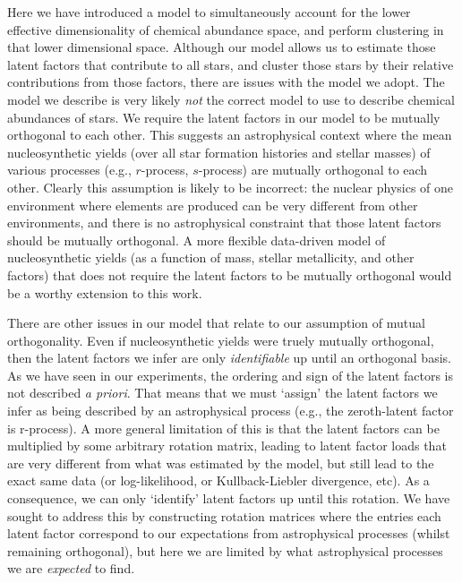 \documentclass[twocolumn]{aastex62}
\begin{document}
Here we have introduced a model to simultaneously account for the lower
effective dimensionality of chemical abundance space, and perform clustering
in that lower dimensional space. Although our model allows us to estimate
those latent factors that contribute to all stars, and cluster those stars by
their relative contributions from those factors, there are issues with the
model we adopt. The model we describe is very likely \emph{not} the correct
model to use to describe chemical abundances of stars. We require the latent
factors in our model to be mutually orthogonal to each other. This suggests
an astrophysical context where the mean nucleosynthetic yields (over all star
formation histories and stellar masses) of various
processes (e.g., $r$-process, $s$-process) are mutually orthogonal to each
other. Clearly this assumption is likely to be incorrect: the nuclear physics
of one environment where elements are produced  can be very different from
other environments, and there is no astrophysical constraint that those
latent factors should be mutually orthogonal.
A more flexible data-driven model of nucleosynthetic yields (as a function of mass,
stellar metallicity, and other factors) that does not require the latent
factors to be mutually orthogonal would be a worthy extension to this work.

There are other issues in our model that relate to our assumption of mutual
orthogonality. Even if nucleosynthetic yields were truely mutually orthogonal,
then the latent factors we infer are only \emph{identifiable} up until an
orthogonal basis. As we have seen in our experiments, the ordering and sign 
of the latent factors is not described \emph{a priori}. That means that we
must `assign' the latent factors we infer as being described by an astrophysical
process (e.g., the zeroth-latent factor is r-process). A more general limitation
of this is that the latent factors can be multiplied by some arbitrary rotation
matrix, leading to latent factor loads that are very different from what was
estimated by the model, but still lead to the exact same data (or log-likelihood,
or Kullback-Liebler divergence, etc). As a consequence, we can only `identify'
latent factors up until this rotation. We have sought to address this by constructing
rotation matrices where the entries each latent factor correspond to our expectations
from astrophysical processes (whilst remaining orthogonal), but here we are limited
by what astrophysical processes we are \emph{expected} to find.
\end{document}
